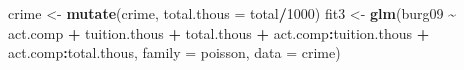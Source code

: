 \documentclass[
]{krantz}
\newenvironment{Shaded}{\begin{snugshade}}{\end{snugshade}}
\newcommand{\AttributeTok}[1]{\textcolor[rgb]{0.27,0.27,0.27}{#1}}
\newcommand{\DecValTok}[1]{\textcolor[rgb]{0.06,0.06,0.06}{#1}}
\newcommand{\FunctionTok}[1]{\textcolor[rgb]{0.27,0.27,0.27}{\textbf{#1}}}
\newcommand{\NormalTok}[1]{#1}
\newcommand{\OtherTok}[1]{\textcolor[rgb]{0.37,0.37,0.37}{#1}}
\newcommand{\SpecialCharTok}[1]{\textcolor[rgb]{0.43,0.43,0.43}{\textbf{#1}}}
\begin{document}
\begin{Shaded}
\begin{Highlighting}[]
\NormalTok{crime }\OtherTok{\textless{}{-}} \FunctionTok{mutate}\NormalTok{(crime, }\AttributeTok{total.thous =}\NormalTok{ total}\SpecialCharTok{/}\DecValTok{1000}\NormalTok{)}
\NormalTok{fit3 }\OtherTok{\textless{}{-}} \FunctionTok{glm}\NormalTok{(burg09 }\SpecialCharTok{\textasciitilde{}}\NormalTok{ act.comp }\SpecialCharTok{+}\NormalTok{ tuition.thous }\SpecialCharTok{+} 
\NormalTok{            total.thous }\SpecialCharTok{+}\NormalTok{ act.comp}\SpecialCharTok{:}\NormalTok{tuition.thous }\SpecialCharTok{+}
\NormalTok{            act.comp}\SpecialCharTok{:}\NormalTok{total.thous, }\AttributeTok{family =}\NormalTok{ poisson, }
            \AttributeTok{data =}\NormalTok{ crime)}
\end{Highlighting}
\end{Shaded}
\end{document}
